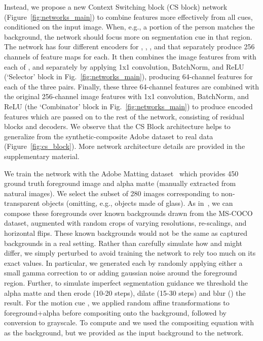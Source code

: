 \documentclass[10pt,twocolumn,letterpaper]{article}
\begin{document}
Instead, we propose a new Context Switching block (CS block) network (Figure~\ref{fig:networks_main}) to combine features more effectively from all cues, conditioned on the input image. When, e.g., a portion of the person matches the background, the network should focus more on  segmentation cue in that region. The network has four different encoders for , , , and  that separately produce 256 channels of feature maps for each. It then combines the image features from  with each of ,  and  separately by applying 1x1 convolution, BatchNorm, and ReLU (`Selector' block in Fig.~\ref{fig:networks_main}), producing 64-channel features for each of the three pairs. Finally, these three 64-channel features are combined with the original 256-channel image features with 1x1 convolution, BatchNorm, and ReLU (the `Combinator' block in Fig.~\ref{fig:networks_main}) to produce encoded features which are passed on to the rest of the network, consisting of residual blocks and decoders. We observe that the CS Block architecture helps to generalize from the synthetic-composite Adobe dataset to real data (Figure~\ref{fig:cs_block}). More network architecture details are provided in the supplementary material.










We train the network with the Adobe Matting dataset~\cite{xu2017deep} which provides 450 ground truth foreground image  and alpha matte  (manually extracted from natural images).  We select the subset of 280 images corresponding to non-transparent objects (omitting, e.g., objects made of glass).  As in~\cite{xu2017deep}, we can compose these foregrounds over known backgrounds drawn from the MS-COCO dataset, augmented with random crops of varying resolutions, re-scalings, and horizontal flips.  These known backgrounds  would not be the same as captured backgrounds  in a real setting.  Rather than carefully simulate how  and  might differ, we simply perturbed  to avoid training the network to rely too much on its exact values.  In particular, we generated each  by randomly applying either a small gamma correction  to  or adding gaussian noise  around the foreground region. Further, to simulate imperfect segmentation guidance  we threshold the alpha matte and then erode (10-20 steps), dilate (15-30 steps) and blur () the result. For the motion cue , we applied random affine transformations to foreground+alpha before compositing onto the background, followed by conversion to grayscale.  To compute  and  we used the compositing equation with  as the background, but we provided  as the input background to the network.
\end{document}
